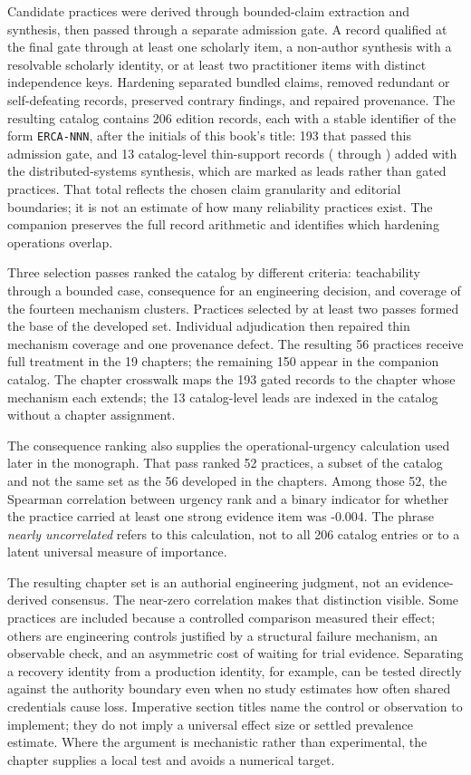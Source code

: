 Candidate practices were derived through bounded-claim extraction and synthesis, then passed through a separate admission gate. A record qualified at the final gate through at least one scholarly item, a non-author synthesis with a resolvable scholarly identity, or at least two practitioner items with distinct independence keys. Hardening separated bundled claims, removed redundant or self-defeating records, preserved contrary findings, and repaired provenance. The resulting catalog contains 206 edition records, each with a stable identifier of the form \texttt{ERCA-NNN}, after the initials of this book's title: 193 that passed this admission gate, and 13 catalog-level thin-support records ( through ) added with the distributed-systems synthesis, which are marked as leads rather than gated practices. That total reflects the chosen claim granularity and editorial boundaries; it is not an estimate of how many reliability practices exist. The companion preserves the full record arithmetic and identifies which hardening operations overlap.

Three selection passes ranked the catalog by different criteria: teachability through a bounded case, consequence for an engineering decision, and coverage of the fourteen mechanism clusters. Practices selected by at least two passes formed the base of the developed set. Individual adjudication then repaired thin mechanism coverage and one provenance defect. The resulting 56 practices receive full treatment in the 19 chapters; the remaining 150 appear in the companion catalog. The chapter crosswalk maps the 193 gated records to the chapter whose mechanism each extends; the 13 catalog-level leads are indexed in the catalog without a chapter assignment.

The consequence ranking also supplies the operational-urgency calculation used later in the monograph. That pass ranked 52 practices, a subset of the catalog and not the same set as the 56 developed in the chapters. Among those 52, the Spearman correlation between urgency rank and a binary indicator for whether the practice carried at least one strong evidence item was -0.004. The phrase \emph{nearly uncorrelated} refers to this calculation, not to all 206 catalog entries or to a latent universal measure of importance.

The resulting chapter set is an authorial engineering judgment, not an evidence-derived consensus. The near-zero correlation makes that distinction visible. Some practices are included because a controlled comparison measured their effect; others are engineering controls justified by a structural failure mechanism, an observable check, and an asymmetric cost of waiting for trial evidence. Separating a recovery identity from a production identity, for example, can be tested directly against the authority boundary even when no study estimates how often shared credentials cause loss. Imperative section titles name the control or observation to implement; they do not imply a universal effect size or settled prevalence estimate. Where the argument is mechanistic rather than experimental, the chapter supplies a local test and avoids a numerical target.

